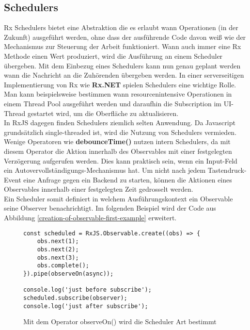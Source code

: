 \subsection{Schedulers}

Rx Schedulers bietet eine Abstraktion die es erlaubt wann Operationen (in der Zukunft) ausgeführt werden, ohne dass der ausführende Code davon weiß wie der Mechanismus zur Steuerung der Arbeit funktioniert. Wann auch immer eine Rx Methode einen Wert produziert, wird die Ausführung an einem Scheduler übergeben. Mit dem Einbezug eines Schedulers kann nun genau geplant werden wann die Nachricht an die Zuhörenden übergeben werden. In einer serverseitigen Implementierung von Rx wie \textbf{Rx.NET} spielen Schedulers eine wichtige Rolle. Man kann beispielsweise bestimmen wann resourcenintensive Operationen in einem Thread Pool ausgeführt werden und daraufhin die Subscription im UI-Thread gestartet wird, um die Oberfläche zu aktualisieren.\\

\noindent
In RxJS dagegen finden Schedulers ziemlich selten Anwendung. Da Javascript grundsätzlich single-threaded ist, wird die Nutzung von Schedulers vermieden. Wenige Operatoren wie \textbf{debounceTime()} nutzen intern Schedulers, da mit diesem Operator die Aktion innerhalb des Observables mit einer festgelegten Verzögerung aufgerufen werden. Dies kann praktisch sein, wenn ein Input-Feld ein Autovervollständigungs-Mechanismus hat. Um nicht nach jedem Tastendruck-Event eine Anfrage gegen ein Backend zu starten, können die Aktionen eines Observables innerhalb einer festgelegten Zeit gedrosselt werden.\\

\noindent
Ein Scheduler somit definiert in welchem Ausführungskontext ein Observable seine Observer benachrichtigt. Im folgenden Beispiel wird der Code aus Abbildung \ref{creation-of-observable-first-example} erweitert.

\begin{figure}[H]
\begin{lstlisting}[basicstyle=\small]
const scheduled = RxJS.Observable.create((obs) => {
    obs.next(1);
    obs.next(2);
    obs.next(3);
    obs.complete();
}).pipe(observeOn(async));

console.log('just before subscribe');
scheduled.subscribe(observer);
console.log('just after subscribe');
\end{lstlisting}
\caption{Mit dem Operator observeOn() wird die Scheduler Art bestimmt}
\end{figure}

